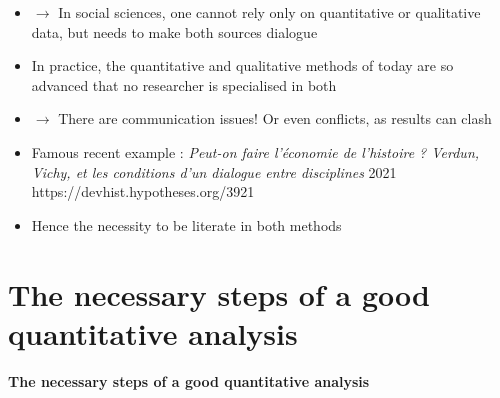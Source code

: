 \documentclass{beamer}
\begin{document}
\begin{frame}
    \begin{itemize}
        \item $\rightarrow$ In social sciences, one cannot rely only on quantitative or qualitative data, but needs to make both sources dialogue
        \vspace{0.2cm}
        \item In practice, the quantitative and qualitative methods of today are so advanced that no researcher is specialised in both
        \vspace{0.2cm}
        \item $\rightarrow$ There are communication issues! Or even conflicts, as results can clash
        \vspace{0.2cm}
        \item Famous recent example : \textit{Peut-on faire l’économie de l’histoire ? Verdun, Vichy, et les conditions d’un dialogue entre disciplines} 2021\\
        https://devhist.hypotheses.org/3921 
        \vspace{0.2cm}
        \item Hence the necessity to be literate in both methods
    \end{itemize}
\end{frame}

\section{The necessary steps of a good quantitative analysis}
\begin{frame}[plain]
    \centering \Large
    \textbf{The necessary steps of a good quantitative analysis}
\end{frame}
\end{document}
